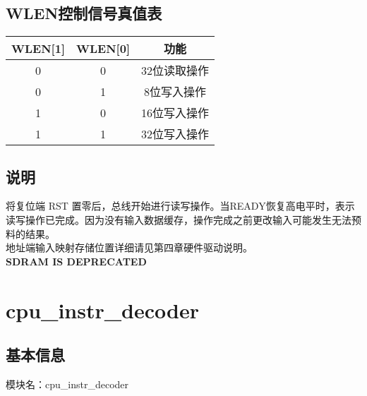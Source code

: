 \subsection{WLEN控制信号真值表}
\begin{tabular}{|c|c|c|}
    \hline
    WLEN[1]  &  WLEN[0] &       功能\\\hline
    0       &   0       &       32位读取操作\\\hline
    0       &   1       &       8位写入操作\\\hline
    1       &   0       &       16位写入操作\\\hline
    1       &   1       &       32位写入操作\\\hline
\end{tabular}
\subsection{说明}
将复位端 RST 置零后，总线开始进行读写操作。当READY恢复高电平时，表示读写操作已完成。因为没有输入数据缓存，操作完成之前更改输入可能发生无法预料的结果。\\
地址端输入映射存储位置详细请见第四章硬件驱动说明。\\
\textbf{SDRAM IS DEPRECATED}

\section{cpu\_instr\_decoder}
\subsection{基本信息}
模块名：cpu\_instr\_decoder

